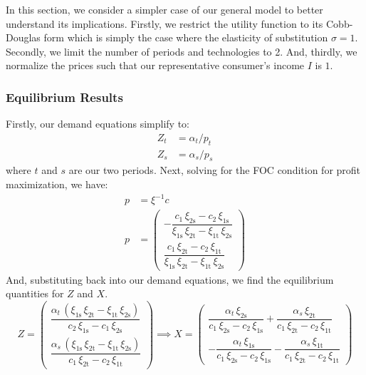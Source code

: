 \documentclass[11pt,a4paper,leqno]{extarticle}
\begin{document}
	In this section, we consider a simpler case of our general model to better understand its implications. Firstly, we restrict the utility function to its Cobb-Douglas form which is simply the case where the elasticity of substitution $\sigma = 1$. Secondly, we limit the number of periods and technologies to 2. And, thirdly, we normalize the prices such that our representative consumer's income $I$ is $1$.
	
	\subsubsection{Equilibrium Results}
	
	Firstly, our demand equations simplify to:
	\begin{align}
	Z_t &= \alpha_t / p_t \\
	Z_s &= \alpha_s / p_s
	\end{align}
	where $t$ and $s$ are our two periods. Next, solving for the FOC condition for profit maximization, we have:
	\begin{align*}
	p &=  \xi^{-1} c \\
	p &= \begin{pmatrix}
	-\dfrac{c_{1}\,\xi _{\mathrm{2s}}-c_{2}\,\xi _{\mathrm{1s}}}{\xi _{\mathrm{1s}}\,\xi _{\mathrm{2t}}-\xi _{\mathrm{1t}}\,\xi _{\mathrm{2s}}}  \\[2ex]
	\dfrac{c_{1}\,\xi _{\mathrm{2t}}-c_{2}\,\xi _{\mathrm{1t}}}{\xi _{\mathrm{1s}}\,\xi _{\mathrm{2t}}-\xi _{\mathrm{1t}}\,\xi _{\mathrm{2s}}} 
	\end{pmatrix} 
	\end{align*}
	And, substituting back into our demand equations, we find the equilibrium quantities for $Z$ and $X$. 
	$$
	Z = \begin{pmatrix}
	\dfrac{\alpha _{t}\,\left(\xi _{\mathrm{1s}}\,\xi _{\mathrm{2t}}-\xi _{\mathrm{1t}}\,\xi _{\mathrm{2s}}\right)}{c_{2}\,\xi _{\mathrm{1s}} - c_{1}\,\xi _{\mathrm{2s}}} \\[2ex]
	\dfrac{\alpha _{s}\,\left(\xi _{\mathrm{1s}}\,\xi _{\mathrm{2t}}-\xi _{\mathrm{1t}}\,\xi _{\mathrm{2s}}\right)}{c_{1}\,\xi _{\mathrm{2t}}-c_{2}\,\xi _{\mathrm{1t}}} 
	\end{pmatrix}
	\implies 
	X = \begin{pmatrix}
	\dfrac{\alpha _{t}\,\xi _{\mathrm{2s}}}{c_{1}\,\xi _{\mathrm{2s}}-c_{2}\,\xi _{\mathrm{1s}}}+\dfrac{\alpha _{s}\,\xi _{\mathrm{2t}}}{c_{1}\,\xi _{\mathrm{2t}}-c_{2}\,\xi _{\mathrm{1t}}} \\[2ex] 
	-\dfrac{\alpha _{t}\,\xi _{\mathrm{1s}}}{c_{1}\,\xi _{\mathrm{2s}}-c_{2}\,\xi _{\mathrm{1s}}}-\dfrac{\alpha _{s}\,\xi _{\mathrm{1t}}}{c_{1}\,\xi _{\mathrm{2t}}-c_{2}\,\xi _{\mathrm{1t}}}
	\end{pmatrix}
	$$
	
\end{document}
